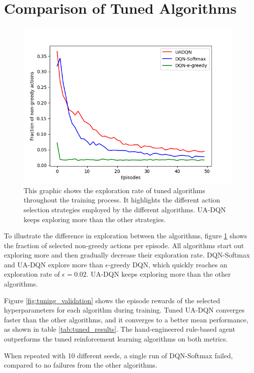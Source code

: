 \section{Comparison of Tuned Algorithms}
\begin{figure}
  \centering
  \includegraphics[width=\figurewidth]{figures/non-greedy-fraction.png}
  \caption{This graphic shows the exploration rate of tuned algorithms throughout the training process. It highlights the different action selection strategies employed by the different algorithms. UA-DQN keeps exploring more than the other strategies.}
  \label{fig:non_greedy_fraction}
\end{figure}
To illustrate the difference in exploration between the algorithms, figure \ref{fig:non_greedy_fraction} shows the fraction of selected non-greedy actions per episode.
All algorithms start out exploring more and then gradually decrease their exploration rate.
DQN-Softmax and UA-DQN explore more than $\epsilon$-greedy DQN, which quickly reaches an exploration rate of $\epsilon = 0.02$.
UA-DQN keeps exploring more than the other algorithms.

Figure \ref{fig:tuning_validation} shows the episode rewards of the selected hyperparameters for each algorithm during training.
Tuned UA-DQN converges faster than the other algorithms, and it converges to a better mean performance, as shown in table \ref{tab:tuned_results}. The hand-engineered rule-based agent outperforms the tuned reinforcement learning algorithms on both metrics.

When repeated with 10 different seeds, a single run of DQN-Softmax failed, compared to no failures from the other algorithms.


